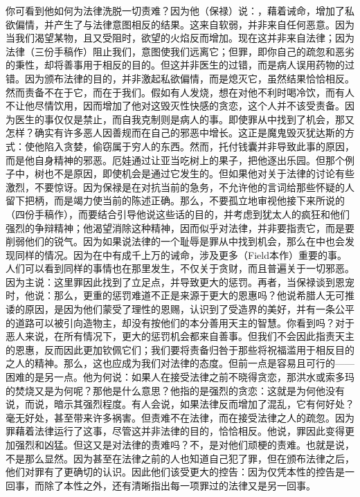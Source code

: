 你可看到他如何为法律洗脱一切责难？因为他（保禄）说：，藉着诫命，增加了私欲偏情，并产生了与法律意图相反的结果。这来自软弱，并非来自任何恶意。因为当我们渴望某物，且又受阻时，欲望的火焰反而增加。现在这并非来自法律；因为法律（三份手稿作）阻止我们，意图使我们远离它；但罪，即你自己的疏忽和恶劣的秉性，却将善事用于相反的目的。但这并非医生的过错，而是病人误用药物的过错。因为颁布法律的目的，并非激起私欲偏情，而是熄灭它，虽然结果恰恰相反。然而责备不在于它，而在于我们。假如有人发烧，想在对他不利时喝冷饮，而有人不让他尽情饮用，因而增加了他对这毁灭性快感的贪恋，这个人并不该受责备。因为医生的事仅仅是禁止，而自我克制则是病人的事。即使罪从中找到了机会，那又怎样？确实有许多恶人因善规而在自己的邪恶中增长。这正是魔鬼毁灭犹达斯的方式：使他陷入贪婪，偷窃属于穷人的东西。然而，托付钱囊并非导致此事的原因，而是他自身精神的邪恶。厄娃通过让亚当吃树上的果子，把他逐出乐园。但那个例子中，树也不是原因，即使机会是通过它发生的。但如果他对关于法律的讨论有些激烈，不要惊讶。因为保禄是在对抗当前的急务，不允许他的言词给那些怀疑的人留下把柄，而是竭力使当前的陈述正确。那么，不要孤立地审视他接下来所说的（四份手稿作），而要结合引导他说这些话的目的，并考虑到犹太人的疯狂和他们强烈的争辩精神；他渴望消除这种精神，因而似乎对法律，并非要指责它，而是要削弱他们的锐气。因为如果说法律的一个耻辱是罪从中找到机会，那么在中也会发现同样的情况。因为在中有成千上万的诫命，涉及更多（Field本作）重要的事。人们可以看到同样的事情也在那里发生，不仅关于贪财，而且普遍关于一切邪恶。因为主说：这里罪因此找到了立足点，并导致更大的惩罚。再者，当保禄谈到恩宠时，他说：那么，更重的惩罚难道不正是来源于更大的恩惠吗？他说希腊人无可推诿的原因，是因为他们蒙受了理性的恩赐，认识到了受造界的美好，并有一条公平的道路可以被引向造物主，却没有按他们的本分善用天主的智慧。你看到吗？对于恶人来说，在所有情况下，更大的惩罚机会都来自善事。但我们不会因此指责天主的恩惠，反而因此更加钦佩它们；我们要将责备归咎于那些将祝福滥用于相反目的之人的精神。那么，这也应成为我们对法律的态度。但前一点是容易且可行的——困难的是另一点。他为何说：如果人在接受法律之前不晓得贪恋，那洪水或索多玛的焚烧又是为何呢？那他是什么意思？他指的是强烈的贪恋：这就是为何他没有说，而说，暗示其强烈程度。有人会说，如果法律反而增加了混乱，它有何好处？毫无好处，甚至带来许多祸害。但责难不在法律，而在接受法律之人的疏忽。因为罪藉着法律运行了这事，尽管这并非法律的目的，恰恰相反。他说，罪因此变得更加强烈和凶猛。但这又是对法律的责难吗？不，是对他们顽梗的责难。也就是说，不是那么显然。因为甚至在法律之前的人也知道自己犯了罪，但在颁布法律之后，他们对罪有了更确切的认识。因此他们该受更大的控告：因为仅凭本性的控告是一回事，而除了本性之外，还有清晰指出每一项罪过的法律又是另一回事。\par

